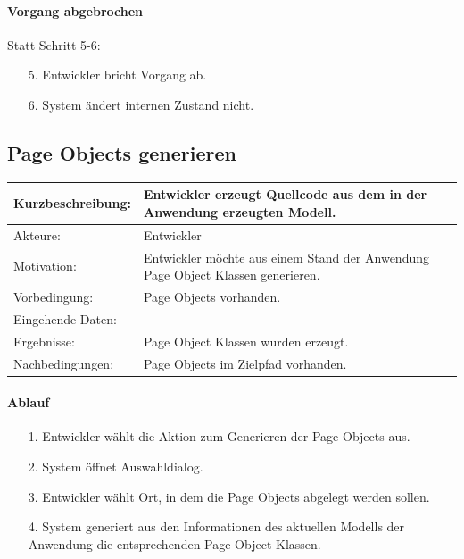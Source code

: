 \paragraph{Vorgang abgebrochen}
Statt Schritt 5-6:
\begin{itemize}[itemsep=0pt]
\item[5.] Entwickler bricht Vorgang ab. 
\item[6.] System ändert internen Zustand nicht. 
\end{itemize}

\subsection{Page Objects generieren}
\label{sec:generate_page_objects}

\begin{tabular}[h]{|p{4cm}|p{}|}
\hline 
\rule[-1ex]{0pt}{2.5ex}Kurzbeschreibung: & 
Entwickler erzeugt Quellcode aus dem in der Anwendung erzeugten Modell. \\  
\hline 
\rule[-1ex]{0pt}{2.5ex}Akteure: & 
Entwickler \\ 
\hline 
\rule[-1ex]{0pt}{2.5ex}Motivation: & 
Entwickler möchte aus einem Stand der Anwendung Page Object Klassen generieren. \\ 
\hline 
\rule[-1ex]{0pt}{2.5ex}Vorbedingung: & 
Page Objects vorhanden. \\
\hline 
\rule[-1ex]{0pt}{2.5ex}Eingehende Daten: & \\ 
\hline 
\rule[-1ex]{0pt}{2.5ex}Ergebnisse: & Page Object Klassen wurden erzeugt. \\ 
\hline 
\rule[-1ex]{0pt}{2.5ex}Nachbedingungen: & Page Objects im Zielpfad vorhanden.  \\ 
\hline 
\end{tabular} 

\paragraph{Ablauf}

\begin{itemize}[itemsep=0pt]
\item[1.] Entwickler wählt die Aktion zum Generieren der Page Objects aus.
\item[2.] System öffnet Auswahldialog. 
\item[3.] Entwickler wählt Ort, in dem die Page Objects abgelegt werden sollen.
\item[4.] System generiert aus den Informationen des aktuellen Modells der Anwendung die entsprechenden Page Object Klassen.

\end{itemize}

